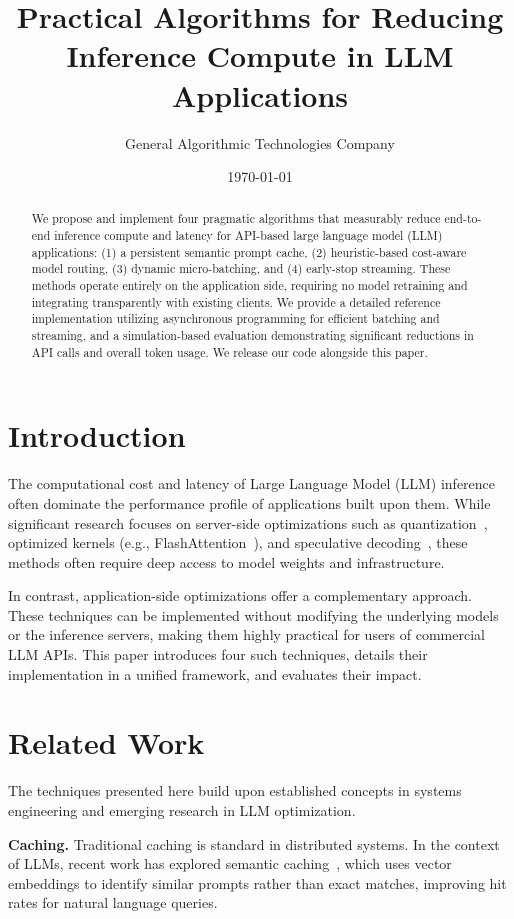 \documentclass[11pt]{article}
\title{Practical Algorithms for Reducing Inference Compute in LLM Applications}
\author{General Algorithmic Technologies Company}
\date{\today}
\begin{document}
\maketitle

\begin{abstract}
We propose and implement four pragmatic algorithms that measurably reduce end-to-end inference compute and latency for API-based large language model (LLM) applications: (1) a persistent semantic prompt cache, (2) heuristic-based cost-aware model routing, (3) dynamic micro-batching, and (4) early-stop streaming. These methods operate entirely on the application side, requiring no model retraining and integrating transparently with existing clients. We provide a detailed reference implementation utilizing asynchronous programming for efficient batching and streaming, and a simulation-based evaluation demonstrating significant reductions in API calls and overall token usage. We release our code alongside this paper.
\end{abstract}

\section{Introduction}
The computational cost and latency of Large Language Model (LLM) inference often dominate the performance profile of applications built upon them. While significant research focuses on server-side optimizations such as quantization~\cite{frantar2022gptq}, optimized kernels (e.g., FlashAttention~\cite{dao2022flashattention}), and speculative decoding~\cite{leviathan2023fast}, these methods often require deep access to model weights and infrastructure.

In contrast, application-side optimizations offer a complementary approach. These techniques can be implemented without modifying the underlying models or the inference servers, making them highly practical for users of commercial LLM APIs. This paper introduces four such techniques, details their implementation in a unified framework, and evaluates their impact.

\section{Related Work}
The techniques presented here build upon established concepts in systems engineering and emerging research in LLM optimization.

\noindent\textbf{Caching.} Traditional caching is standard in distributed systems. In the context of LLMs, recent work has explored semantic caching~\cite{sharma2023caching}, which uses vector embeddings to identify similar prompts rather than exact matches, improving hit rates for natural language queries.
\end{document}

